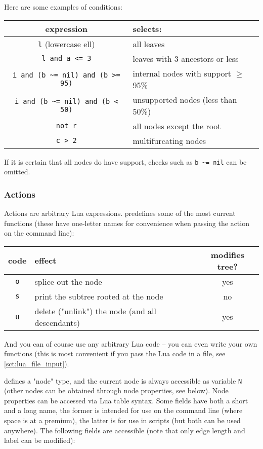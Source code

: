 \noindent{}Here are some examples of \luaed{} conditions:

\begin{center}
\begin{tabular}{cl}
expression & selects: \\
\hline
\texttt{l} (lowercase ell) & all leaves \\
\texttt{l and a <= 3} & leaves with 3 ancestors or less \\
\texttt{i and (b \~{ }= nil) and (b >= 95)} & internal nodes with support $\geq$ 95\% \\ 
\texttt{i and (b \~{ }= nil) and (b < 50)} & unsupported nodes (less than 50\%) \\
\texttt{not r} & all nodes except the root \\
\texttt{c > 2} & multifurcating nodes
\end{tabular}
\end{center}

\noindent{}If it is certain that all nodes do have support, checks such as
\verb+b ~= nil+ can be omitted.

\subsubsection{Actions}

Actions are arbitrary Lua expressions. \luaed{} predefines some of the most
current functions (these have one-letter names for convenience when passing the
action on the command line):

\begin{center}
	\begin{tabular}{clc}
		code & effect & modifies tree?\\
		\hline
		\texttt{o}	& splice out the node 									& yes \\
		\texttt{s}	& print the subtree rooted at the node 	& no \\
		\texttt{u} 	& delete ("unlink") the node (and all descendants) & yes
	\end{tabular}
\end{center}
  
And you can of course use any arbitrary Lua code -- you can even write your own
functions (this is most convenient if you pass the Lua code in a file, see
\ref{sct:lua_file_input}).

\sched{} defines a "node" type, and the current node is always accessible as
variable \texttt{N} (other nodes can be obtained through node properties, see
below).  Node properties can be accessed via Lua table syntax. Some fields have
both a short and a long name, the former is intended for use on the command line
(where space is at a premium), the latter is for use in scripts (but both can be
used anywhere). The following fields are accessible (note that only edge length
and label can be modified):

